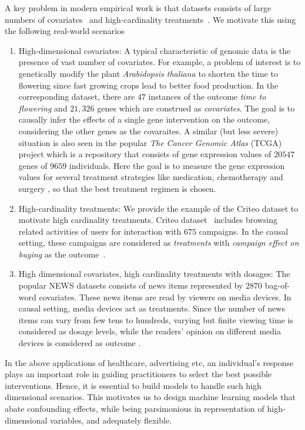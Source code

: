 \documentclass[twoside,11pt]{article}
\begin{document}
 A key problem in modern empirical work is that datasets consists of large numbers of covariates~\citep{Newman-2012} and high-cardinality  treatments~\citep{DiemertMeynet2017}. We motivate this using the following real-world scenarios
 \begin{enumerate}
     \item High-dimensional covariates: A typical characteristic of genomic data is the presence of vast number of covariates. For example, a problem of interest is to genetically modify the plant \emph{Arabidopsis thaliana} to shorten the time to flowering \citep{buhlmann2013causal} since fast growing crops lead to better food production. In the corresponding dataset, there are $47$ instances of the outcome \emph{time to flowering} and $21,326$ genes which are construed as \emph{covariates}. The goal is to causally infer the effects of a single gene intervention on the outcome, considering the other genes as the covaraites. A similar (but less severe) situation is also seen in the popular \emph{The Cancer Genomic Atlas} (TCGA) project \citep{weinstein2013cancer} which is a repository that consists of gene expression values of $20547$ genes of $9659$ individuals. Here the goal is to measure the gene expression values for several treatment strategies like medication, chemotherapy and surgery \citep{schwab2019learning}, so that the best treatment regimen is chosen. 
     \item High-cardinality treatments: We provide the example of the Criteo dataset to motivate high cardinality treatments. Criteo dataset~\citep{DiemertMeynet2017} includes browsing related activities of users for interaction with $675$ campaigns. In the causal setting, these campaigns are considered as \emph{treatments} with \emph{campaign effect on buying} as the outcome~\citep{dalessandro2012causally}.
     \item High dimensional covariates, high cardinality treatments with dosages: The popular NEWS datasets consists of news items represented by $2870$ bag-of-word covariates. These news items are read by viewers on media devices. In causal setting, media devices act as treatments. Since the number of news items can vary from few tens to hundreds, varying but finite viewing time is considered as dosage levels, while the readers' opinion on different media devices is considered as outcome \citep{schwab2019learning}.
 \end{enumerate}
 
In the above applications of healthcare, advertising etc, an individual's response plays an important role in guiding practitioners to select the best possible interventions. Hence, it is essential to build models to handle such high dimensional scenarios. This motivates us to design machine learning models that abate confounding effects, while being parsimonious in representation of high-dimensional variables, and adequately flexible. 
\end{document}
